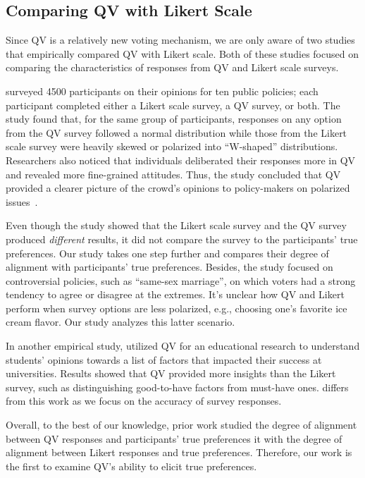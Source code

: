 \subsection{Comparing QV with Likert Scale}
Since QV is a relatively new voting mechanism, we are only aware of two studies that empirically compared QV with Likert scale. Both of these studies focused on comparing the characteristics of responses from QV and Likert scale surveys.

\textcite{quarfoot2017quadratic} surveyed 4500 participants on their opinions for ten public policies; each participant completed either a Likert scale survey, a QV survey, or both.  The study found that, for the same group of participants, responses on any option from the QV survey followed a normal distribution while those from the Likert scale survey were heavily skewed or polarized into ``W-shaped'' distributions. Researchers also noticed that individuals deliberated their responses more in QV and revealed more fine-grained attitudes. Thus, the study concluded that QV provided a clearer picture of the crowd's opinions to policy-makers on polarized issues~\cite{quarfoot2017quadratic}. 

Even though the study showed that the Likert scale survey and the QV survey produced \textit{different} results, it did not compare the survey {} to the participants' true preferences. Our study takes one step further and compares their degree of alignment with participants' true preferences. Besides, the study focused on controversial policies, such as ``same-sex marriage'', on which voters had a strong tendency to agree or disagree at the extremes. It's unclear how QV and Likert perform when survey options are less polarized, e.g., choosing one's favorite ice cream flavor. Our study analyzes this latter scenario.

In another empirical study, \textcite{naylor2017first} utilized QV for an educational research to understand students' opinions towards a list of factors that impacted their success at universities. Results showed that QV provided more insights than the Likert survey, such as distinguishing good-to-have factors from must-have ones. {} differs from this work as we focus on {} the accuracy of survey responses.

Overall, to the best of our knowledge, prior work {} studied the degree of alignment between QV responses and participants' true preferences {} it with the degree of alignment between Likert responses and true preferences. Therefore, our work is the first to examine QV's ability to elicit true preferences.

